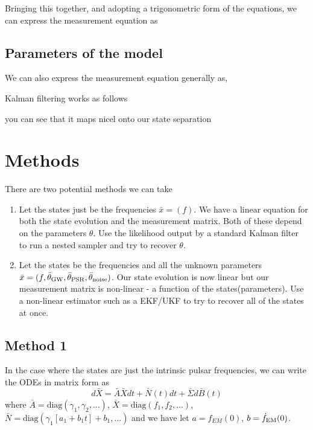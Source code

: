 \documentclass[fleqn,usenatbib,useAMS]{mnras}
\begin{document}
\noindent Bringing this together, and adopting a trigonometric form of the equations, we can express the measurement equation as 






\subsection{Parameters of the model}
\noindent 



We can also express the measurement equation generally as,









Kalman filtering works as follows


you can see that it maps nicel onto our state separation 





\section{Methods}


There are two potential methods we can take

\begin{enumerate}
	\item Let the states just be the frequencies $\bar{x} = (f)$. We have a linear equation for both the state evolution and the measurement matrix. Both of these depend on the parameters $\theta$. Use the likelihood output by a standard Kalman filter to run a nested sampler and try to recover $\theta$.
	\item Let the states be the frequencies and all the unknown parameters $\bar{x} = (f, \bar{\theta}_{\rm GW},\bar{\theta}_{\rm PSR},\bar{\theta}_{\rm noise})$. Our state evolution is now linear but our measurement matrix is non-linear - a function of the states(parameters). Use a non-linear estimator such as a EKF/UKF to try to recover all of the states at once.
\end{enumerate}


\subsection{Method 1}


In the case where the states are just the intrinsic pulsar frequencies, we can write the ODEs in matrix form as
\begin{equation}
	d\bar{X} = \bar{A} \bar{X} dt + \bar{N}(t) dt + \bar{\Sigma} d\bar{B}(t) 
\end{equation}
where $\bar{A} = \text{diag}(\gamma_1, \gamma_2,...)$,  $\bar{X} = \text{diag}(f_1, f_2,...)$, $\bar{N} =\text{diag}(\gamma_1[a_1+b_1t] + b_1, ...)$
and we have let $a = f_{EM}(0)$, $b = \dot{f}_{\rm EM}(0)$.
\end{document}
